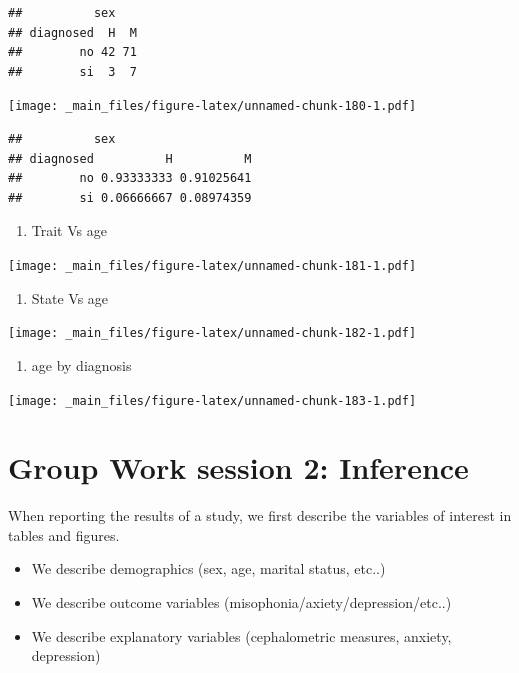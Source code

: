 \documentclass[
]{book}
\providecommand{\tightlist}{%
  \setlength{\itemsep}{0pt}\setlength{\parskip}{0pt}}
\begin{document}
\begin{verbatim}
##          sex
## diagnosed  H  M
##        no 42 71
##        si  3  7
\end{verbatim}

\texttt{[image: \_main\_files/figure-latex/unnamed-chunk-180-1.pdf]}

\begin{verbatim}
##          sex
## diagnosed          H          M
##        no 0.93333333 0.91025641
##        si 0.06666667 0.08974359
\end{verbatim}

\begin{enumerate}
\def\labelenumi{\alph{enumi}.}
\setcounter{enumi}{7}
\tightlist
\item
  Trait Vs age
\end{enumerate}

\texttt{[image: \_main\_files/figure-latex/unnamed-chunk-181-1.pdf]}

\begin{enumerate}
\def\labelenumi{\roman{enumi}.}
\tightlist
\item
  State Vs age
\end{enumerate}

\texttt{[image: \_main\_files/figure-latex/unnamed-chunk-182-1.pdf]}

\begin{enumerate}
\def\labelenumi{\alph{enumi}.}
\setcounter{enumi}{9}
\tightlist
\item
  age by diagnosis
\end{enumerate}

\texttt{[image: \_main\_files/figure-latex/unnamed-chunk-183-1.pdf]}

\hypertarget{group-work-session-2-inference}{%
\section{Group Work session 2: Inference}\label{group-work-session-2-inference}}

When reporting the results of a study, we first describe the variables of interest in tables and figures.

\begin{itemize}
\tightlist
\item
  We describe demographics (sex, age, marital status, etc..)
\item
  We describe outcome variables (misophonia/axiety/depression/etc..)
\item
  We describe explanatory variables (cephalometric measures, anxiety, depression)
\end{itemize}
\end{document}

